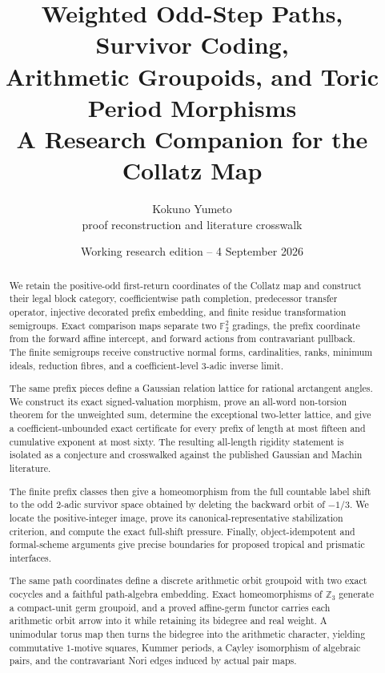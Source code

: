 \documentclass[11pt,letterpaper]{article}
\title{Weighted Odd-Step Paths, Survivor Coding,\\
Arithmetic Groupoids, and Toric Period Morphisms\\
\large A Research Companion for the Collatz Map}
\author{Kokuno Yumeto\\
\small proof reconstruction and literature crosswalk}
\date{Working research edition -- 4 September 2026}
\theoremstyle{definition}
\theoremstyle{remark}
\begin{document}
\maketitle

\begin{abstract}
We retain the positive-odd first-return coordinates of the Collatz map and
construct their legal block category, coefficientwise path completion,
predecessor transfer operator, injective decorated prefix embedding, and
finite residue transformation semigroups.  Exact comparison maps separate
two $\mathbb F_2^2$ gradings, the prefix coordinate from the forward affine
intercept, and forward actions from contravariant pullback.  The finite
semigroups receive constructive normal forms, cardinalities, ranks, minimum
ideals, reduction fibres, and a coefficient-level $3$-adic inverse limit.

The same prefix pieces define a Gaussian relation lattice for rational
arctangent angles.  We construct its exact signed-valuation morphism, prove an
all-word non-torsion theorem for the unweighted sum, determine the exceptional
two-letter lattice, and give a coefficient-unbounded exact certificate for
every prefix of length at most fifteen and cumulative exponent at most sixty.
The resulting all-length rigidity statement is isolated as a conjecture and
crosswalked against the published Gaussian and Machin literature.

The finite prefix classes then give a homeomorphism from the full countable
label shift to the odd $2$-adic survivor space obtained by deleting the
backward orbit of $-1/3$.  We locate the positive-integer image, prove its
canonical-representative stabilization criterion, and compute the exact
full-shift pressure.  Finally, object-idempotent and formal-scheme arguments
give precise boundaries for proposed tropical and prismatic interfaces.

The same path coordinates define a discrete arithmetic orbit groupoid with
two exact cocycles and a faithful path-algebra embedding.  Exact
homeomorphisms of $\mathbb Z_3$ generate a compact-unit germ groupoid, and a
proved affine-germ functor carries each arithmetic orbit arrow into it while
retaining its bidegree and real weight.  A unimodular torus map then turns the
bidegree into the arithmetic character, yielding commutative $1$-motive
squares, Kummer periods, a Cayley isomorphism of algebraic pairs, and the
contravariant Nori edges induced by actual pair maps.


\end{abstract}
\end{document}
